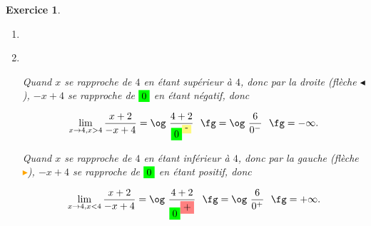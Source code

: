 \documentclass[10pt]{article}
\newtheorem{exo}{Exercice}
\newcommand\setItemnumber[1]{\setcounter{enumi}{\numexpr#1-1\relax}}
\begin{document}
\begin{exo}
\begin{enumerate}
\setItemnumber{3}
\item \item ~{}

\begin{center}
\newcommand*{\z}{\colorbox{green}{$0$}}
\end{center}

\setlength{\columnseprule}{1pt}
\begin{multicols}{2}


Quand $x$ se rapproche de $4$ en étant supérieur à $4$, donc par la droite (flèche \textcolor{blue!50!black}{$\blacktriangleleft$}), $-x+4$ se rapproche de $\colorbox{green}{0}$ en étant \colorbox{yellow!50}{négatif}, donc

\[\lim\limits_{x\to 4,x>4}\frac{x+2}{-x+4}=\text{\og}~\frac{4+2}{\colorbox{green}{0}^{\colorbox{yellow!50}{-}}}~\text{ \fg}=\text{\og}~\frac{6}{0^-}~\text{ \fg}=-\infty.\]




\columnbreak
Quand $x$ se rapproche de $4$ en étant inférieur à $4$, donc par la gauche (flèche \textcolor{orange}{$\blacktriangleright$}), $-x+4$ se rapproche de $\colorbox{green}{0}$ en étant \colorbox{red!50}{positif}, donc


\[\lim\limits_{x\to 4,x<4}\frac{x+2}{-x+4}=\text{\og}~\frac{4+2}{\colorbox{green}{0}^{\colorbox{red!50}{+}}}~\text{ \fg}=\text{\og}~\frac{6}{0^+}~\text{ \fg}=+\infty.\]

\end{multicols}
\end{enumerate}

\begin{enumerate}



\end{enumerate}
\end{exo}
\end{document}
